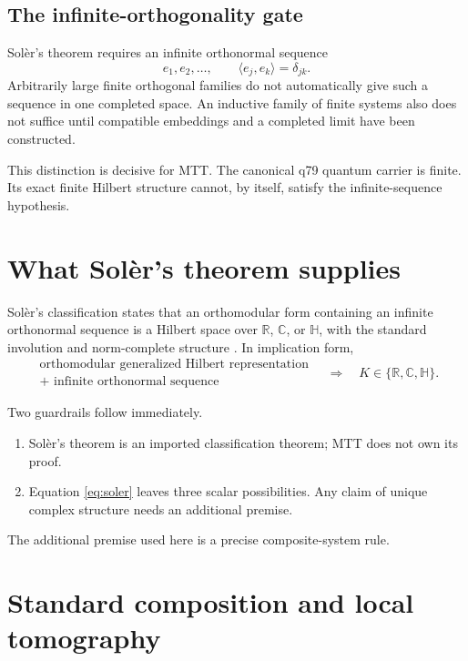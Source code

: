 \documentclass[11pt]{article}
\newcommand{\R}{\mathbb{R}}
\newcommand{\C}{\mathbb{C}}
\newcommand{\HH}{\mathbb{H}}
\begin{document}
\subsection{The infinite-orthogonality gate}

Sol\`er's theorem requires an infinite orthonormal sequence
\[
e_1,e_2,\ldots,\qquad
\langle e_j,e_k\rangle=\delta_{jk}.
\]
Arbitrarily large finite orthogonal families do not automatically give such a sequence in one completed space. An inductive family of finite systems also does not suffice until compatible embeddings and a completed limit have been constructed.

This distinction is decisive for MTT. The canonical q79 quantum carrier is finite. Its exact finite Hilbert structure cannot, by itself, satisfy the infinite-sequence hypothesis.

\section{What Sol\`er's theorem supplies}

Sol\`er's classification states that an orthomodular form containing an infinite orthonormal sequence is a Hilbert space over \(\R\), \(\C\), or \(\HH\), with the standard involution and norm-complete structure
\cite{Soler1995,Holland1995}. In implication form,
\begin{equation}
\begin{gathered}
\text{orthomodular generalized Hilbert representation}\\
+\text{ infinite orthonormal sequence}
\end{gathered}
\quad\Longrightarrow\quad
K\in\{\R,\C,\HH\}.
\label{eq:soler}
\end{equation}

Two guardrails follow immediately.

\begin{enumerate}
\item Sol\`er's theorem is an imported classification theorem; MTT does not own its proof.
\item Equation \eqref{eq:soler} leaves three scalar possibilities. Any claim of unique complex structure needs an additional premise.
\end{enumerate}

The additional premise used here is a precise composite-system rule.

\section{Standard composition and local tomography}
\end{document}
